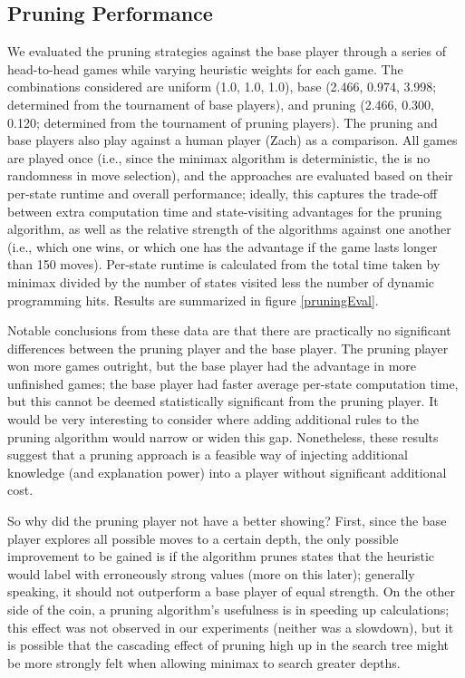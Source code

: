 \documentclass[letterpaper]{article}
\begin{document}
\subsection{Pruning Performance}
We evaluated the pruning strategies against the base player through a series of head-to-head games while varying heuristic weights for each game.  The combinations considered are uniform (1.0, 1.0, 1.0), base (2.466, 0.974, 3.998; determined from the tournament of base players), and pruning (2.466, 0.300, 0.120; determined from the tournament of pruning players).  The pruning and base players also play against a human player (Zach) as a comparison.  All games are played once (i.e., since the minimax algorithm is deterministic, the is no randomness in move selection), and the approaches are evaluated based on their per-state runtime and overall performance; ideally, this captures the trade-off between extra computation time and state-visiting advantages for the pruning algorithm, as well as the relative strength of the algorithms against one another (i.e., which one wins, or which one has the advantage if the game lasts longer than 150 moves).  Per-state runtime is calculated from the total time taken by minimax divided by the number of states visited less the number of dynamic programming hits.  Results are summarized in figure \ref{pruningEval}.

Notable conclusions from these data are that there are practically no significant differences between the pruning player and the base player.  The pruning player won more games outright, but the base player had the advantage in more unfinished games; the base player had faster average per-state computation time, but this cannot be deemed statistically significant from the pruning player.  It would be very interesting to consider where adding additional rules to the pruning algorithm would narrow or widen this gap.  Nonetheless, these results suggest that a pruning approach is a feasible way of injecting additional knowledge (and explanation power) into a player without significant additional cost.

So why did the pruning player not have a better showing?  First, since the base player explores all possible moves to a certain depth, the only possible improvement to be gained is if the algorithm prunes states that the heuristic would label with erroneously strong values (more on this later); generally speaking, it should not outperform a base player of equal strength.  On the other side of the coin, a pruning algorithm's usefulness is in speeding up calculations; this effect was not observed in our experiments (neither was a slowdown), but it is possible that the cascading effect of pruning high up in the search tree might be more strongly felt when allowing minimax to search greater depths.
\end{document}
